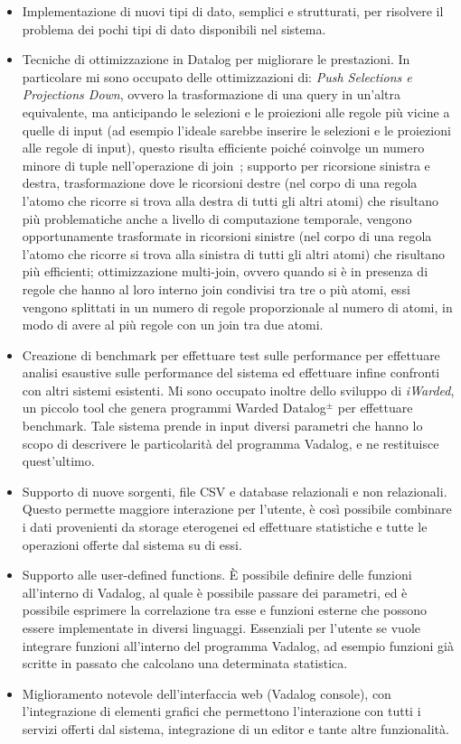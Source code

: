 \begin{itemize}
	\item Implementazione di nuovi tipi di dato, semplici e strutturati, per risolvere il problema dei pochi tipi di dato disponibili nel sistema.
	\item Tecniche di ottimizzazione in Datalog per migliorare le prestazioni. In particolare mi sono occupato delle ottimizzazioni di: \emph{Push Selections e Projections Down}, ovvero la trasformazione di una query in un'altra equivalente, ma anticipando le selezioni e le proiezioni alle regole più vicine a quelle di input (ad esempio l'ideale sarebbe inserire le selezioni e le proiezioni alle regole di input), questo risulta efficiente poiché coinvolge un numero minore di tuple nell'operazione di join~\cite{atzeni2006basi}; supporto per ricorsione sinistra e destra, trasformazione dove le ricorsioni destre (nel corpo di una regola l'atomo che ricorre si trova alla destra di tutti gli altri atomi) che risultano più problematiche anche a livello di computazione temporale, vengono opportunamente trasformate in ricorsioni sinistre (nel corpo di una regola l'atomo che ricorre si trova alla sinistra di tutti gli altri atomi) che risultano più efficienti; ottimizzazione multi-join, ovvero quando si è in presenza di regole che hanno al loro interno join condivisi tra tre o più atomi, essi vengono splittati in un numero di regole proporzionale al numero di atomi, in modo di avere al più regole con un join tra due atomi.
	\item Creazione di benchmark per effettuare test sulle performance per effettuare analisi esaustive sulle performance del sistema ed effettuare infine confronti con altri sistemi esistenti. Mi sono occupato inoltre dello sviluppo di \textit{iWarded}, un piccolo tool che genera programmi Warded Datalog$^\pm $ per effettuare benchmark. Tale sistema prende in input diversi parametri che hanno lo scopo di descrivere le particolarità del programma Vadalog, e ne restituisce quest'ultimo.
	\item Supporto di nuove sorgenti, file CSV e database relazionali e non relazionali. Questo permette maggiore interazione per l'utente, è così possibile combinare i dati provenienti da storage eterogenei ed effettuare statistiche e tutte le operazioni offerte dal sistema su di essi.
	\item Supporto alle user-defined functions. È possibile definire delle funzioni all'interno di Vadalog, al quale è possibile passare dei parametri, ed è possibile esprimere la correlazione tra esse e funzioni esterne che possono essere implementate in diversi linguaggi. Essenziali per l'utente se vuole integrare funzioni all'interno del programma Vadalog, ad esempio funzioni già scritte in passato che calcolano una determinata statistica.
	\item Miglioramento notevole dell'interfaccia web (Vadalog console), con l'integrazione di elementi grafici che permettono l'interazione con tutti i servizi offerti dal sistema, integrazione di un editor e tante altre funzionalità. \newline
\end{itemize} 
